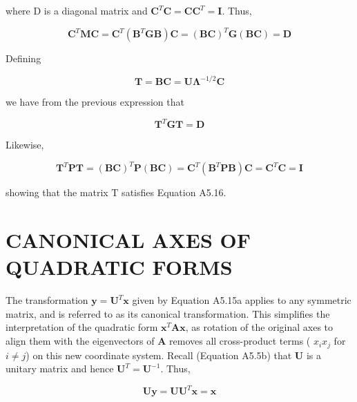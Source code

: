 \documentclass{article}
\begin{document}
where D is a diagonal matrix and  $ \mathbf{C}^T\mathbf{C} = \mathbf{C}\mathbf{C}^T = \mathbf{I} $. Thus,

\begin{equation}
\mathbf{C}^{T}\mathbf{M}\mathbf{C}=\mathbf{C}^{T}\left(\mathbf{B}^{T}\mathbf{G}\mathbf{B}\right)\mathbf{C}=\left(\mathbf{B}\mathbf{C}\right)^{T}\mathbf{G}\left(\mathbf{B}\mathbf{C}\right)=\mathbf{D}
\end{equation}

Defining

\begin{equation}
\mathbf{T}=\mathbf{B}\mathbf{C}=\mathbf{U}\boldsymbol{\Lambda}^{-1/2}\mathbf{C}
\end{equation}

we have from the previous expression that

\begin{equation}
\mathbf{T}^{T}\mathbf{G}\mathbf{T}=\mathbf{D}
\end{equation}

Likewise,

\begin{equation}
\mathbf{T}^{T}\mathbf{P}\mathbf{T}=\left(\mathbf{B}\mathbf{C}\right)^{T}\mathbf{P}\left(\mathbf{B}\mathbf{C}\right)=\mathbf{C}^{T}\left(\mathbf{B}^{T}\mathbf{P}\mathbf{B}\right)\mathbf{C}=\mathbf{C}^{T}\mathbf{C}=\mathbf{I}
\end{equation}

showing that the matrix T satisfies Equation A5.16.

\section{CANONICAL AXES OF QUADRATIC FORMS}
The transformation  $ \mathbf{y} = \mathbf{U}^T \mathbf{x} $ given by Equation A5.15a applies to any symmetric matrix, and is referred to as its canonical transformation. This simplifies the interpretation of the quadratic form  $ \mathbf{x}^T \mathbf{A} \mathbf{x} $, as rotation of the original axes to align them with the eigenvectors of  $ \mathbf{A} $ removes all cross-product terms ( $ x_i x_j $ for  $ i \neq j $) on this new coordinate system. Recall (Equation A5.5b) that  $ \mathbf{U} $ is a unitary matrix and hence  $ \mathbf{U}^T = \mathbf{U}^{-1} $. Thus,

\begin{equation}
\mathbf{U}\mathbf{y}=\mathbf{U}\mathbf{U}^{T}\mathbf{x}=\mathbf{x}
\end{equation}
\end{document}
